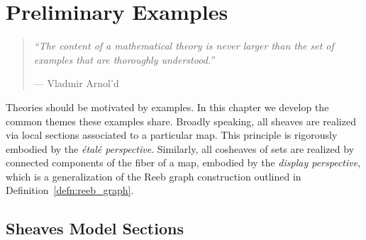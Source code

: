 
%
%
\chapter{Preliminary Examples}
\label{sec:examples}

\begin{quote}
{\em``The content of a mathematical theory is never larger than the set of examples that are thoroughly understood.''}
\begin{flushright} --- Vladmir Arnol'd~\cite{arnol2004lectures} \end{flushright}
\end{quote}


Theories should be motivated by examples. In this chapter we develop the common themes these examples share. Broadly speaking, all sheaves are realized via local sections associated to a particular map. This principle is rigorously embodied by the \emph{\'etal\'e perspective}. Similarly, all cosheaves of sets are realized by connected components of the fiber of a map, embodied by the \emph{display perspective}, which is a generalization of the Reeb graph construction outlined in Definition~\ref{defn:reeb_graph}.

\section{Sheaves Model Sections}


